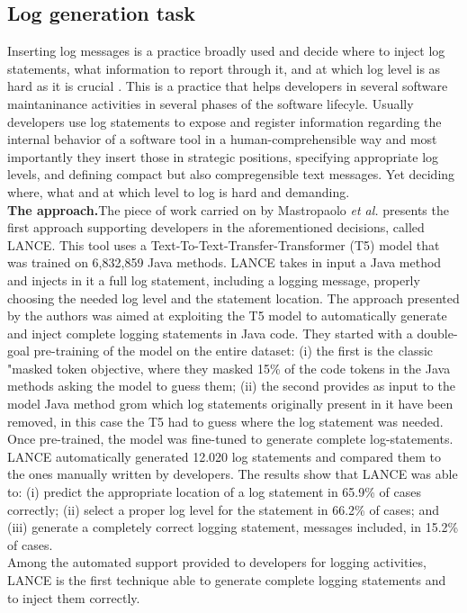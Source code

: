 \subsection{Log generation task}
Inserting log messages is a practice broadly used and decide where to inject log statements, what information to report through it, 
and at which log level is as hard as it is crucial \cite{Mastropaolo2022}. 
This is a practice that helps developers in several software maintaninance activities in several 
phases of the software lifecyle. Usually developers use log statements to expose and register information 
regarding the internal behavior of a software tool in a human-comprehensible way and most importantly they insert those
in strategic positions, specifying appropriate log levels, and defining 
compact but also compregensible text messages. Yet deciding where, what and at which level to log is
hard and demanding.\\ 
\newline
\textbf{The approach.}The piece of work carried on by Mastropaolo \textit{et al.} presents the first 
approach supporting developers in the aforementioned decisions, called LANCE. This tool uses 
a Text-To-Text-Transfer-Transformer (T5) model that was trained on 6,832,859 Java methods.
LANCE takes in input a Java method and injects in it a full log statement, including 
a logging message, properly choosing the needed log level and the statement location.
The approach presented by the authors was aimed at exploiting the T5 model \cite{} to automatically
generate and inject complete logging statements in Java code. 
They started with a double-goal pre-training of the model on the entire dataset: (i) the first is the classic 
"masked token objective, where they masked 15\% of the code tokens in the Java methods asking the model 
to guess them; (ii) the second provides as input to the model  Java method grom which log statements 
originally present in it have been removed, in this case the T5 had to guess
where the log statement was needed. Once pre-trained, the model was fine-tuned 
to generate complete log-statements. LANCE automatically generated 12.020 log statements
and compared them to the ones manually written by developers. The results 
show that LANCE was able to: (i) predict the appropriate location of a log statement 
in 65.9\% of cases correctly; (ii) select a proper log level for the statement in 66.2\% of cases; and 
(iii) generate a completely correct logging statement, messages included, in 15.2\% of cases.\\
\newline
Among the automated support provided to developers for logging activities, LANCE is the first
technique able to generate complete logging statements and to inject them correctly.






